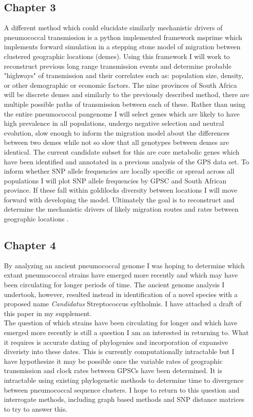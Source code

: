 \documentclass{article}
\begin{document}
\subsection{Chapter 3}
A different method which could elucidate similarly mechanistic drivers of pneumococcal transmission is a python implemented framework msprime which implements forward simulation in a stepping stone model of migration between clustered geographic locations (demes). Using this framework I will work to reconstruct previous long range transmission events and determine probable "highways" of transmission and their correlates such as: population size, density, or other demographic or economic factors. The nine provinces of South Africa will be discrete demes and similarly to the previously described method, there are multiple possible paths of transmission between each of these. Rather than using the entire pneumococcal pangenome I will select genes which are likely to have high prevalence in all populations, undergo negative selection and neutral evolution, slow enough to inform the migration model about the differences between two demes while not so slow that all genotypes between demes are identical. The current candidate subset for this are core metabolic genes which have been identified and annotated in a previous analysis of the GPS data set. To inform whether SNP allele frequencies are locally specific or spread across all populations I will plot SNP allele frequencies by GPSC and South African province. If these fall within goldilocks diversity between locations I will move forward with developing the model. Ultimately the goal is to reconstruct and determine the mechanistic drivers of likely migration routes and rates between geographic locations \cite{kelleherEfficientCoalescentSimulation2016,gutenkunstInferringJointDemographic2009}. 
\subsection{Chapter 4}
By analyzing an ancient pneumococcal genome I was hoping to determine which extant pneumococcal strains have emerged more recently and which may have been circulating for longer periods of time. The ancient genome analysis I undertook, however, resulted instead in identification of a novel species with a proposed name \textit{Candidatus} Streptococcus syltholmis. I have attached a draft of this paper in my supplement. \\The question of which strains have been circulating for longer and which have emerged more recently is still a question I am an interested in returning to. What it requires is accurate dating of phylogenies and incorporation of expansive diveristy into these dates. This is currently computationally intractable but I have hypothesize it may be possible once the variable rates of geographic transmission and clock rates between GPSCs have been determined. It is intractable using existing phylogenetic methods to determine time to divergence between pneumococcal sequence clusters. I hope to return to this question and interrogate methods, including graph based methods and SNP distance matrices to try to answer this.
\end{document}
